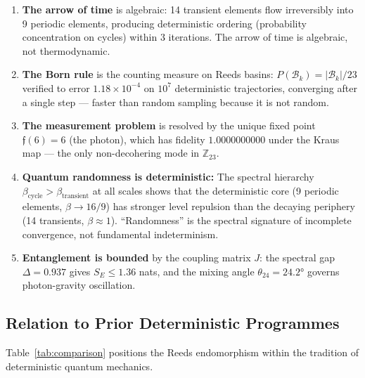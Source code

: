\documentclass[12pt,a4paper]{article}
\theoremstyle{definition}
\theoremstyle{remark}
\newcommand{\Reeds}{\mathfrak{f}}
\newcommand{\Zp}{\mathbb{Z}_{23}}
\newcommand{\Basin}{\mathcal{B}}
\newcommand{\Jcoup}{J}
\begin{document}
\begin{enumerate}
  \item \textbf{The arrow of time} is algebraic: 14 transient elements flow
  irreversibly into 9 periodic elements, producing deterministic ordering
  (probability concentration on cycles) within 3 iterations. The arrow of time
  is algebraic, not thermodynamic.

  \item \textbf{The Born rule} is the counting measure on Reeds basins:
  $P(\Basin_k) = |\Basin_k|/23$ verified to error $1.18 \times 10^{-4}$ on
  $10^7$ deterministic trajectories, converging after a single step --- faster
  than random sampling because it is not random.

  \item \textbf{The measurement problem} is resolved by the unique fixed point
  $\Reeds(6) = 6$ (the photon), which has fidelity $1.0000000000$ under the Kraus
  map --- the only non-decohering mode in $\Zp$.

  \item \textbf{Quantum randomness is deterministic:} The spectral hierarchy
  $\beta_{\text{cycle}} > \beta_{\text{transient}}$ at all scales shows that the
  deterministic core (9 periodic elements, $\beta \to 16/9$) has stronger level
  repulsion than the decaying periphery (14 transients, $\beta \approx 1$).
  ``Randomness'' is the spectral signature of incomplete convergence, not
  fundamental indeterminism.

  \item \textbf{Entanglement is bounded} by the coupling matrix $\Jcoup$: the
  spectral gap $\Delta = 0.937$ gives $S_E \leq 1.36$ nats, and the mixing angle
  $\theta_{24} = 24.2°$ governs photon-gravity oscillation.
\end{enumerate}

\subsection{Relation to Prior Deterministic Programmes}

Table~\ref{tab:comparison} positions the Reeds endomorphism within the
tradition of deterministic quantum mechanics.
\end{document}
